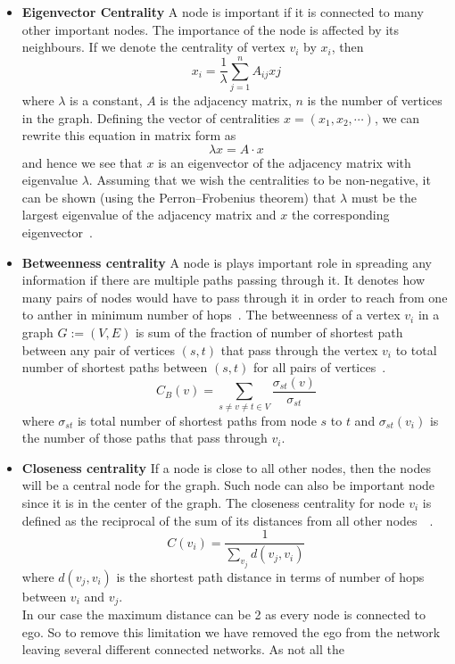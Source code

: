 \begin{itemize}
\item
\textbf{Eigenvector Centrality}
A node is important if it is connected to many other important nodes.
The importance of the node is affected by its neighbours.  If we
denote the centrality of vertex $v_i$ by $x_i$, then $$x_{i} =
\frac{1}{\lambda} \sum\limits_{j=1}^n A_{ij}x{j}$$ where $\lambda$ is
a constant, $A$ is the adjacency matrix, $n$ is the number of vertices
in the graph.  Defining the vector of centralities $x = (x_1, x_2,
\cdots)$, we can rewrite this equation in matrix form as $$\lambda x =
A·x$$ and hence we see that $x$ is an eigenvector of the adjacency
matrix with eigenvalue $\lambda$.  Assuming that we wish the
centralities to be non-negative, it can be shown (using the
Perron–Frobenius theorem) that $\lambda$ must be the largest
eigenvalue of the adjacency matrix and $x$ the corresponding
eigenvector~\cite{newman2008mathematics}.
\item
\textbf{Betweenness centrality}
A node is plays important role in spreading any information if there
are multiple paths passing through it.  It denotes how many pairs of
nodes would have to pass through it in order to reach from one to
anther in minimum number of hops~\cite{freeman1977set}.  The
betweenness of a vertex $v_i$ in a graph $G:=(V,E)$ is sum of the
fraction of number of shortest path between any pair of vertices
$(s,t)$ that pass through the vertex $v_i$ to total number of shortest
paths between $(s,t)$ for all pairs of
vertices~\cite{brandes2001faster}.
$$C_B(v)= \sum_{s \neq v \neq t \in
V}\frac{\sigma_{st}(v)}{\sigma_{st}}$$
where $\sigma_{st}$ is total number of shortest paths from node $s$ to
$t$ and $\sigma_{st}(v_i)$ is the number of those paths that pass
through $v_i$.
\item
\textbf{Closeness centrality}
If a node is close to all other nodes, then the nodes will be a
central node for the graph.  Such node can also be important node
since it is in the center of the graph.  The closeness centrality for
node $v_i$ is defined as the reciprocal of the sum of its distances
from all other
nodes~\cite{bavelas1950communication}~\cite{sabidussi1966centrality}.
$$C(v_i)= \frac{1}{\sum_{v_j} d(v_j,v_i)}$$
where $d(v_j,v_i)$ is the shortest path distance in terms of number of
hops between $v_i$ and $v_j$.\\
In our case the maximum distance can be 2 as every node is connected
to ego.  So to remove this limitation we have removed the ego from the
network leaving several different connected networks.  As not all the

\end{itemize}
